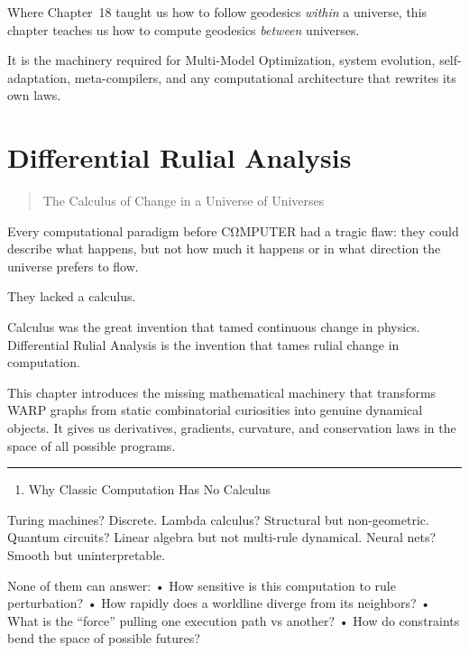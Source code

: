 Where Chapter~18 taught us how to follow geodesics \emph{within} a universe, 
this chapter teaches us how to compute geodesics \emph{between} universes.

It is the machinery required for Multi-Model Optimization, 
system evolution, self-adaptation, meta-compilers, and any computational 
architecture that rewrites its own laws.

\section{Differential Rulial
Analysis}\label{differential-rulial-analysis}

\begin{quote}
The Calculus of Change in a Universe of Universes
\end{quote}

Every computational paradigm before CΩMPUTER had a tragic flaw: they
could describe what happens, but not how much it happens or in what
direction the universe prefers to flow.

They lacked a calculus.

Calculus was the great invention that tamed continuous change in
physics. Differential Rulial Analysis is the invention that tames rulial
change in computation.

This chapter introduces the missing mathematical machinery that
transforms WARP graphs from static combinatorial curiosities into genuine
dynamical objects. It gives us derivatives, gradients, curvature, and
conservation laws in the space of all possible programs.

\begin{center}\rule{0.5\linewidth}{0.5pt}\end{center}

\begin{enumerate}
\def\labelenumi{\arabic{enumi}.}
\tightlist
\item
  Why Classic Computation Has No Calculus
\end{enumerate}

Turing machines? Discrete. Lambda calculus? Structural but
non-geometric. Quantum circuits? Linear algebra but not multi-rule
dynamical. Neural nets? Smooth but uninterpretable.

None of them can answer: • How sensitive is this computation to rule
perturbation? • How rapidly does a worldline diverge from its neighbors?
• What is the ``force'' pulling one execution path vs another? • How do
constraints bend the space of possible futures?

